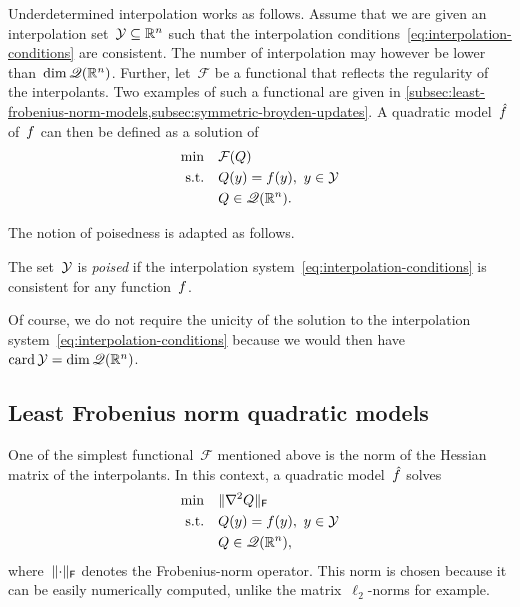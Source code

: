Underdetermined interpolation works as follows.
Assume that we are given an interpolation set~$\xpt \subseteq \R^n$ such that the interpolation conditions~\cref{eq:interpolation-conditions} are consistent.
The number of interpolation may however be lower than~$\dim \mathscr{Q}(\mathbb{R}^n)$.
Further, let~$\mathcal{F}$ be a functional that reflects the regularity of the interpolants.
Two examples of such a functional are given in \cref{subsec:least-frobenius-norm-models,subsec:symmetric-broyden-updates}.
A quadratic model~$\objm$ of~$f$ can then be defined as a solution of
\begin{align*}
    \min        & \quad \mathcal{F}(Q)\\
    \text{s.t.} & \quad Q(y) = \obj(y), ~ y \in \xpt\\
                & \quad Q \in \qpoly.
\end{align*}

The notion of poisedness is adapted as follows.

\begin{definition}[Poisedness]
    The set~$\xpt$ is \emph{poised} if the interpolation system~\cref{eq:interpolation-conditions} is consistent for any function~$f$.
\end{definition}

Of course, we do not require the unicity of the solution to the interpolation system~\cref{eq:interpolation-conditions} because we would then have~$\card \xpt = \dim \qpoly$.

\subsection{Least Frobenius norm quadratic models}
\label{subsec:least-frobenius-norm-models}

One of the simplest functional~$\mathcal{F}$ mentioned above is the norm of the Hessian matrix of the interpolants.
In this context, a quadratic model~$\objm$ solves
\begin{align*}
    \min        & \quad \norm{\nabla^2 Q}_{\mathsf{F}}\\
    \text{s.t.} & \quad Q(y) = \obj(y), ~ y \in \xpt\\
                & \quad Q \in \qpoly,
\end{align*}
where~$\lVert\cdot\rVert_{\mathsf{F}}$ denotes the Frobenius-norm operator.
This norm is chosen because it can be easily numerically computed, unlike the matrix~$\ell_2$-norms for example.

